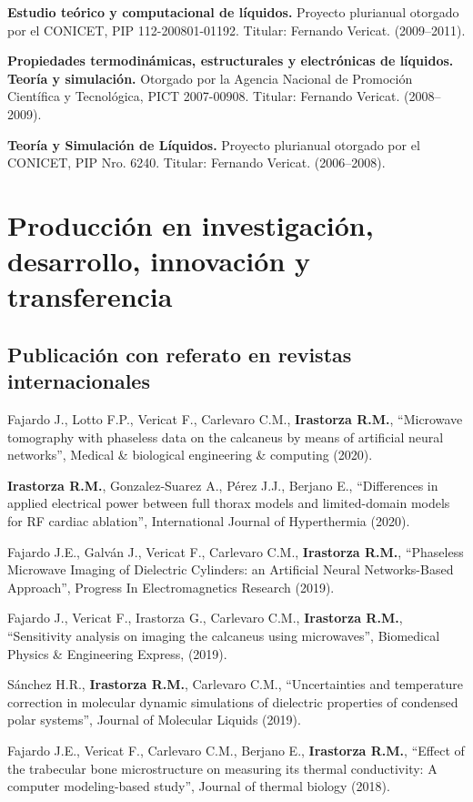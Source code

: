 \documentclass[margin,line]{res}
\begin{document}
\begin{resume}
\textbf{Estudio teórico y computacional de líquidos.} Proyecto plurianual otorgado por el CONICET, PIP  112-200801-01192. Titular: Fernando Vericat. (2009--2011).

\textbf{Propiedades termodinámicas, estructurales y electrónicas de líquidos. Teoría y simulación.} Otorgado por la Agencia Nacional de Promoción Científica y Tecnológica, PICT 2007-00908. Titular: Fernando Vericat. (2008--2009).

\textbf{Teoría y Simulación de Líquidos.} Proyecto plurianual otorgado por el CONICET, PIP Nro. 6240. Titular: Fernando Vericat. (2006--2008).\\


\section{ Producción en investigación, desarrollo, innovación y transferencia}
\vspace*{-.2in}
\subsection{ Publicación con referato en revistas internacionales}


Fajardo J., Lotto F.P., Vericat F., Carlevaro C.M., \textbf{Irastorza R.M.}, ``Microwave tomography with phaseless data on the calcaneus by means of artificial neural networks'', Medical \& biological engineering \& computing (2020).

\textbf{Irastorza R.M.}, Gonzalez-Suarez A., Pérez J.J., Berjano E., ``Differences in applied electrical power between full thorax models and limited-domain models for RF cardiac ablation'', International Journal of Hyperthermia (2020).

Fajardo J.E., Galván J., Vericat F., Carlevaro C.M., \textbf{Irastorza R.M.}, ``Phaseless Microwave Imaging of Dielectric Cylinders: an Artificial Neural Networks-Based Approach'', Progress In Electromagnetics Research (2019).

Fajardo J., Vericat F., Irastorza G., Carlevaro C.M., \textbf{Irastorza R.M.},
``Sensitivity analysis on imaging the calcaneus using microwaves'', Biomedical Physics \& Engineering Express, (2019).

Sánchez H.R., {\bf Irastorza R.M.}, Carlevaro C.M., ``Uncertainties and temperature correction in molecular dynamic simulations of dielectric properties of condensed polar systems'', Journal of Molecular Liquids (2019).

Fajardo J.E., Vericat F., Carlevaro C.M., Berjano E., \textbf{Irastorza R.M.}, ``Effect of the trabecular bone microstructure on measuring its thermal conductivity: A computer modeling-based study'', Journal of thermal biology (2018).


\end{resume}
\end{document}
